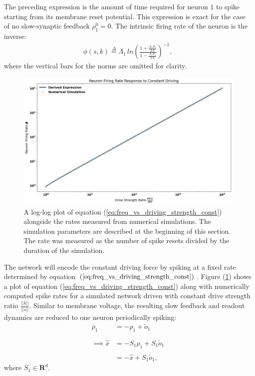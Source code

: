 \begin{enumerate}
The preceding expression is the amount of time required for neuron $1$ to spike starting from its membrane reset potential. This expression is exact for the case of no slow-synaptic feedback $\rho_1^0 = 0$. The intrinsic firing rate of the neuron is the inverse:
\begin{align}
\label{eq:freq_vs_driving_strength_const}
\phi(s,k) \overset{\Delta}{=}
\Lambda_1\,ln \left( \frac{1 + \frac{\Lambda_1 S_1}{2 \, k} } { 1  - \frac{\Lambda_1 S_1}{2 \, k}} \right)^{-1},
\end{align}
where the vertical bars for the norms are omitted for clarity.

\begin{figure}
\centering
\includegraphics[width=\linewidth]{figures/phi_vs_k_const_driving.png}
\caption{A log-log plot of equation (\ref{eq:freq_vs_driving_strength_const}) alongside the rates measured from numerical simulations. The simulation parameters are described at the beginning of this section.  The rate was measured as the number of spike resets divided by the duration of the simulation. }\label{fig:spike_rate_vs_k_const_driving}
\end{figure}

The network will encode the constant driving force by spiking at a fixed rate determined by equation $(\ref{eq:freq_vs_driving_strength_const})$. Figure (\ref{fig:spike_rate_vs_k_const_driving}) shows a plot of equation (\ref{eq:freq_vs_driving_strength_const}) along with numerically computed spike rates for a simulated network driven with constant drive strength ratio $\frac{||k||}{||s||}$.  Similar to membrane voltage, the resulting slow feedback  and readout dynamics are reduced to one neuron periodically spiking:
\begin{align*}
\dot{\rho_1} &= -\rho_1 + \tilde{o}_1 \\ 
\\
\implies 
\dot{\hat{x}} &= - S_1 \rho_1 + S_1 \tilde{o}_1\\
\\ 
&= - \hat{x} + S_1 \tilde{o}_1,
\end{align*}
where $S_1 \in \mathbf{R}^{d}.$



\end{enumerate}
